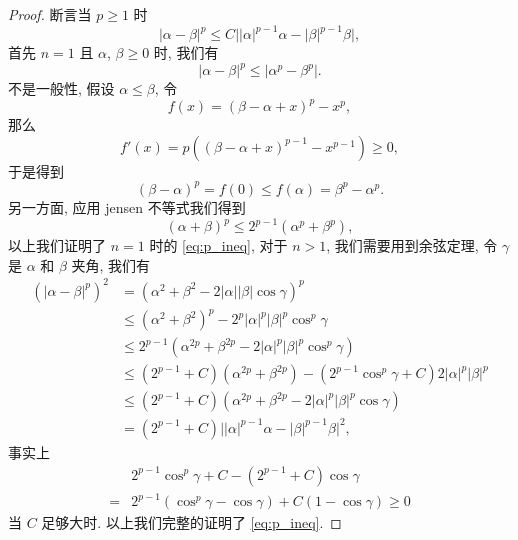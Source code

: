 \documentclass[twoside,longtitle]{LZUthesis}
\theoremstyle{definition}
\numberwithin{equation}{chapter}
\newcommand*\abs[1]{\lvert#1\rvert}
\begin{document}
\begin{proof}
	断言当 $p \geq 1 $ 时
	\begin{equation}\label{eq:p_ineq}
		\abs{\alpha-\beta}^p \leq C\abs{\abs{\alpha}^{p-1}\alpha - \abs{\beta}^{p-1}\beta},
	\end{equation}
	首先 $n = 1$ 且 $\alpha$, $\beta \geq 0$ 时, 我们有
	\begin{equation}
		\abs{\alpha-\beta}^p \leq \abs{\alpha^p - \beta^p}.
	\end{equation}
	不是一般性, 假设 $\alpha \leq \beta$, 令
	\begin{equation}
		f(x) = (\beta-\alpha+x)^p - x^p,
	\end{equation}
	那么
	\begin{equation}
		f'(x) = p\left((\beta-\alpha+x)^{p-1} - x^{p-1}\right) \geq 0,
	\end{equation}
	于是得到
	\begin{equation}
		\left(\beta-\alpha\right)^p = f(0) \leq f(\alpha) = \beta^p - \alpha^p.
	\end{equation}
	另一方面, 应用 jensen 不等式我们得到
	\begin{equation}
		\left(\alpha+\beta\right)^p \leq 2^{p-1}\left(\alpha^p + \beta^p\right),
	\end{equation}
	以上我们证明了 $n = 1$ 时的 \cref{eq:p_ineq},
	对于 $n > 1$, 我们需要用到余弦定理, 令 $\gamma$ 是 $\alpha$ 和 $\beta$ 夹角, 我们有
	\begin{equation}
		\begin{split}
			\left(\abs{\alpha-\beta}^p\right)^2
			&= \left(\alpha^2 + \beta^2 - 2 \abs{\alpha}\abs{\beta}\cos{\gamma}\right)^p\\
			&\leq \left(\alpha^2+\beta^2\right)^p - 2^p\abs{\alpha}^p\abs{\beta}^p\cos^p{\gamma}\\
			&\leq 2^{p-1}\left(\alpha^{2p} + \beta^{2p} - 2\abs{\alpha}^p\abs{\beta}^p\cos^p{\gamma}\right)\\
			&\leq \left(2^{p-1}+C\right)\left(\alpha^{2p} + \beta^{2p}\right)
			- \left(2^{p-1}\cos^p{\gamma}+C\right)2\abs{\alpha}^p\abs{\beta}^p\\
			&\leq \left(2^{p-1}+C\right)\left(\alpha^{2p} + \beta^{2p} - 2\abs{\alpha}^p\abs{\beta}^p\cos{\gamma}\right)\\
			&= \left(2^{p-1}+C\right)\abs{\abs{\alpha}^{p-1}\alpha - \abs{\beta}^{p-1}\beta}^2,
		\end{split}
	\end{equation}
	事实上
	\begin{equation}
		\begin{split}
			& 2^{p-1}\cos^p{\gamma} + C - \left(2^{p-1}+C\right)\cos{\gamma}\\
			={} & 2^{p-1}\left(\cos^p{\gamma} - \cos{\gamma}\right) + C\left(1-\cos{\gamma}\right)
			\geq 0
		\end{split}
	\end{equation}
	当 $C$ 足够大时. 以上我们完整的证明了 \cref{eq:p_ineq}.


\end{proof}
\end{document}
